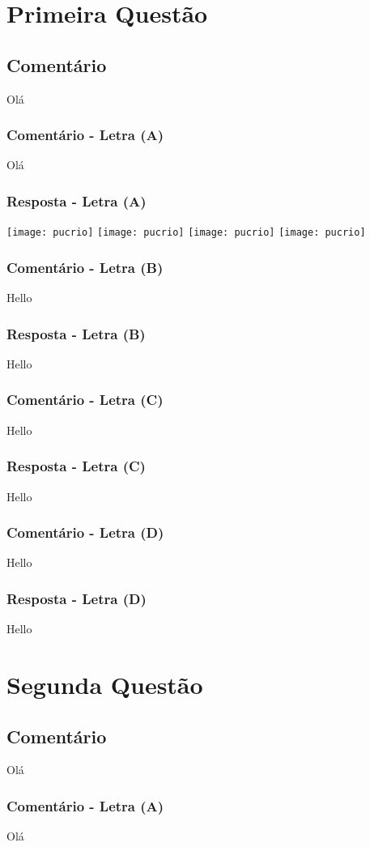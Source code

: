 \documentclass[12pt, a4paper]{article}
\begin{document}
\section{Primeira Questão}
	\subsection{Comentário}
		Olá
		\subsubsection{Comentário - Letra (A)}
			Olá
		\subsubsection{Resposta - Letra (A)}
			\texttt{[image: pucrio]}
			\texttt{[image: pucrio]}
			\texttt{[image: pucrio]}
			\texttt{[image: pucrio]}
		\subsubsection{Comentário - Letra (B)}
			Hello
		\subsubsection{Resposta - Letra (B)}
			Hello
		\subsubsection{Comentário - Letra (C)}
			Hello	
		\subsubsection{Resposta - Letra (C)}
			Hello
		\subsubsection{Comentário - Letra (D)}
			Hello	
		\subsubsection{Resposta - Letra (D)}
			Hello
\section{Segunda Questão}
	\subsection{Comentário}
		Olá
		\subsubsection{Comentário - Letra (A)}
			Olá
\end{document}
